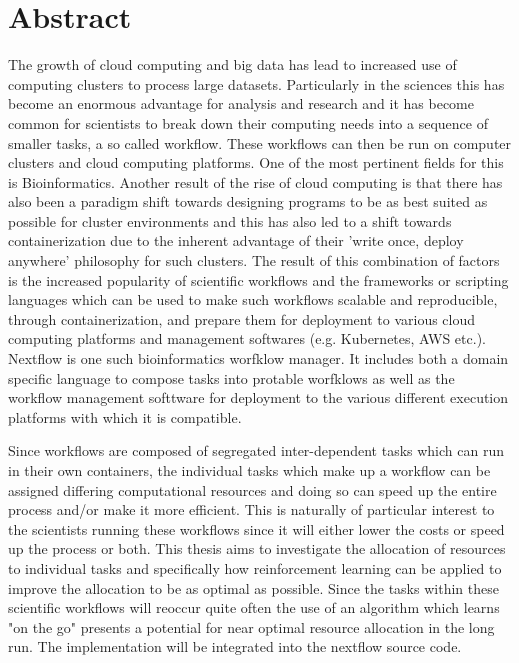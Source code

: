 
\cleardoublepage
{}
\section*{Abstract}

The growth of cloud computing and big data has lead to increased use of computing clusters to process large datasets. Particularly in the sciences this has become an enormous advantage for analysis and research and it has become common for scientists to break down their computing needs into a sequence of smaller tasks, a so called workflow. These workflows can then be run on computer clusters and cloud computing platforms. One of the most pertinent fields for this is Bioinformatics.  
Another result of the rise of cloud computing is that there has also been a paradigm shift towards designing programs to be as best suited as possible for cluster environments and this has also led to a shift towards containerization due to the inherent advantage of their 'write once, deploy anywhere' philosophy for such clusters. The result of this combination of factors is the increased popularity of scientific workflows and the frameworks or scripting languages which can be used to make such workflows scalable and reproducible, through containerization, and prepare them for deployment to various cloud computing platforms and management softwares (e.g. Kubernetes, AWS etc.). Nextflow is one such bioinformatics worfklow manager. It includes both a domain specific language to compose tasks into protable worfklows as well as the workflow management softtware for deployment to the various different execution platforms with which it is compatible.    

Since workflows are composed of segregated inter-dependent tasks which can run in their own containers, the individual tasks which make up a workflow can be assigned differing computational resources and doing so can speed up the entire process and/or make it more efficient. This is naturally of particular interest to the scientists running these workflows since it will either lower the costs or speed up the process or both. This thesis aims to investigate the allocation of resources to individual tasks and specifically how reinforcement learning can be applied to improve the allocation to be as optimal as possible. Since the tasks within these scientific workflows will reoccur quite often the use of an algorithm which learns "on the go" presents a potential for near optimal resource allocation in the long run. The implementation will be integrated into the nextflow source code.

